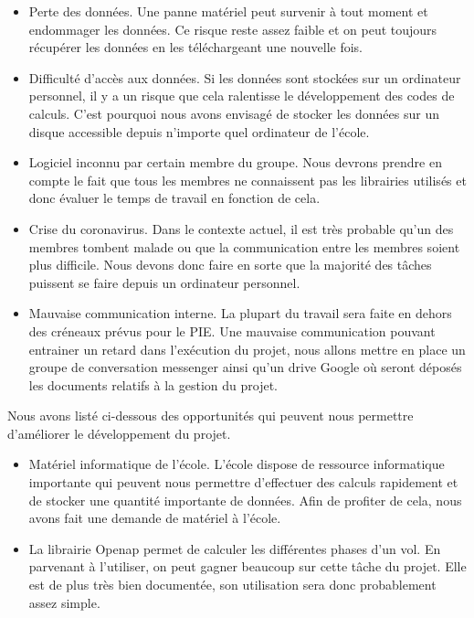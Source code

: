 \begin{itemize}
	\item Perte des données. Une panne matériel peut survenir à tout moment et endommager les données. Ce risque reste assez faible et on peut toujours récupérer les données en les téléchargeant une nouvelle fois.
	
	\item Difficulté d'accès aux données. Si les données sont stockées sur un ordinateur personnel, il y a un risque que cela ralentisse le développement des codes de calculs. C'est pourquoi nous avons envisagé de stocker les données sur un disque accessible depuis n'importe quel ordinateur de l'école.
	
	\item Logiciel inconnu par certain membre du groupe. Nous devrons prendre en compte le fait que tous les membres ne connaissent pas les librairies utilisés et donc évaluer le temps de travail en fonction de cela.
	
	\item Crise du coronavirus. Dans le contexte actuel, il est très probable qu'un des membres tombent malade ou que la communication entre les membres soient plus difficile. Nous devons donc faire en sorte que la majorité des tâches puissent se faire depuis un ordinateur personnel.
	
	\item Mauvaise communication interne. La plupart du travail sera faite en dehors des créneaux prévus pour le PIE. Une mauvaise communication pouvant entrainer un retard dans l'exécution du projet, nous allons mettre en place un groupe de conversation messenger ainsi qu'un drive Google où seront déposés les documents relatifs à la gestion du projet.
	
\end{itemize}


Nous avons listé ci-dessous des opportunités qui peuvent nous permettre d'améliorer le développement du projet.
\begin{itemize}
	\item Matériel informatique de l'école. L'école dispose de ressource informatique importante qui peuvent nous permettre d'effectuer des calculs rapidement et de stocker une quantité importante de données. Afin de profiter de cela, nous avons fait une demande de matériel à l'école.
	\item La librairie Openap permet de calculer les différentes phases d'un vol. En parvenant à l'utiliser, on peut gagner beaucoup sur cette tâche du projet. Elle est de plus très bien documentée, son utilisation sera donc probablement assez simple.
\end{itemize}
